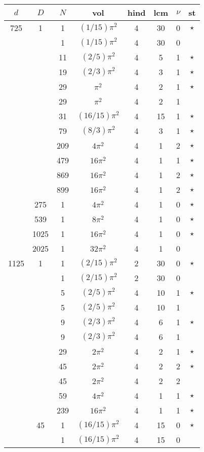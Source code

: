 \begin{tabular}{ccc|ccccc}
$d$ & $D$ & $N$ & vol & hind & lcm & $\nu$ & st\\
\hline
725 & 1 & 1 & $(1/15)\pi^2$ & 4 & 30 & 0 & $\star$ \\
 &  & 1 & $(1/15)\pi^2$ & 4 & 30 & 0 &  \\
 &  & 11 & $(2/5)\pi^2$ & 4 & 5 & 1 & $\star$ \\
 &  & 19 & $(2/3)\pi^2$ & 4 & 3 & 1 & $\star$ \\
 &  & 29 & $\pi^2$ & 4 & 2 & 1 & $\star$ \\
 &  & 29 & $\pi^2$ & 4 & 2 & 1 &  \\
 &  & 31 & $(16/15)\pi^2$ & 4 & 15 & 1 & $\star$ \\
 &  & 79 & $(8/3)\pi^2$ & 4 & 3 & 1 & $\star$ \\
 &  & 209 & $4\pi^2$ & 4 & 1 & 2 & $\star$ \\
 &  & 479 & $16\pi^2$ & 4 & 1 & 1 & $\star$ \\
 &  & 869 & $16\pi^2$ & 4 & 1 & 2 & $\star$ \\
 &  & 899 & $16\pi^2$ & 4 & 1 & 2 & $\star$ \\
 & 275 & 1 & $4\pi^2$ & 4 & 1 & 0 & $\star$ \\
 & 539 & 1 & $8\pi^2$ & 4 & 1 & 0 & $\star$ \\
 & 1025 & 1 & $16\pi^2$ & 4 & 1 & 0 & $\star$ \\
 & 2025 & 1 & $32\pi^2$ & 4 & 1 & 0 &  \\
1125 & 1 & 1 & $(2/15)\pi^2$ & 2 & 30 & 0 & $\star$ \\
 &  & 1 & $(2/15)\pi^2$ & 2 & 30 & 0 &  \\
 &  & 5 & $(2/5)\pi^2$ & 4 & 10 & 1 & $\star$ \\
 &  & 5 & $(2/5)\pi^2$ & 4 & 10 & 1 &  \\
 &  & 9 & $(2/3)\pi^2$ & 4 & 6 & 1 & $\star$ \\
 &  & 9 & $(2/3)\pi^2$ & 4 & 6 & 1 &  \\
 &  & 29 & $2\pi^2$ & 4 & 2 & 1 & $\star$ \\
 &  & 45 & $2\pi^2$ & 4 & 2 & 2 & $\star$ \\
 &  & 45 & $2\pi^2$ & 4 & 2 & 2 &  \\
 &  & 59 & $4\pi^2$ & 4 & 1 & 1 & $\star$ \\
 &  & 239 & $16\pi^2$ & 4 & 1 & 1 & $\star$ \\
 & 45 & 1 & $(16/15)\pi^2$ & 4 & 15 & 0 & $\star$ \\
 &  & 1 & $(16/15)\pi^2$ & 4 & 15 & 0 &  \\

\end{tabular}
